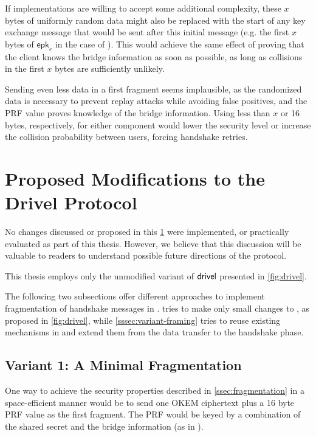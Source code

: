 If implementations are willing to accept some additional complexity, these $x$ bytes of uniformly random data might also be replaced with the start of any key exchange message that would be sent after this initial message (e.g. the first $x$ bytes of $\mathsf{epk}_e$ in the case of \drivel{}). This would achieve the same effect of proving that the client knows the bridge information as soon as possible, as long as collisions in the first $x$ bytes are sufficiently unlikely.

Sending even less data in a first fragment seems implausible, as the randomized data is necessary to prevent replay attacks while avoiding false positives, and the PRF value proves knowledge of the bridge information. Using less than $x$ or 16 bytes, respectively, for either component would lower the security level or increase the collision probability between users, forcing handshake retries.

\section{Proposed Modifications to the Drivel Protocol} \label{ssec:drivel-mod}

No changes discussed or proposed in this \cref{ssec:drivel-mod} were implemented, or practically evaluated as part of this thesis. However, we believe that this discussion will be valuable to readers to understand possible future directions of the protocol.

This thesis employs only the unmodified variant of $\textsf{drivel}{}$ presented in \cref{fig:drivel}.

The following two subsections offer different approaches to implement fragmentation of handshake messages in \drivel{}.  tries to make only small changes to \drivel{}, as proposed in \cref{fig:drivel}, while \cref{sssec:variant-framing} tries to reuse existing mechanisms in \obfsfour{} and extend them from the data transfer to the handshake phase.

\subsection{Variant 1: A Minimal Fragmentation} \label{sssec:variant-minimal}

One way to achieve the security properties described in \cref{ssec:fragmentation} in a space-efficient manner would be to send one OKEM ciphertext plus a 16 byte PRF value as the first fragment. The PRF would be keyed by a combination of the shared secret and the bridge information (as in \drivel{}).


